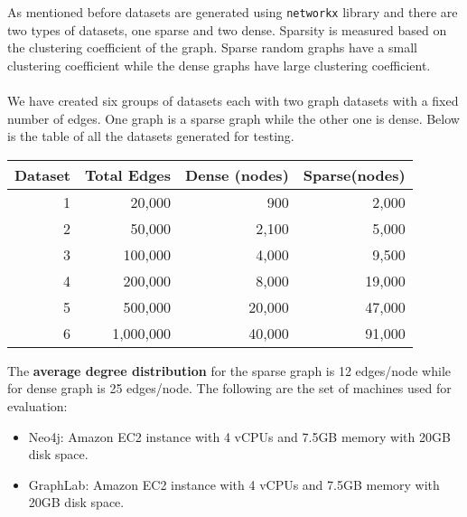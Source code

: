 As mentioned before datasets are generated using \texttt{networkx} library and there are two types of datasets, one sparse and two dense. Sparsity is measured based on the clustering coefficient of the graph. Sparse random graphs have a small clustering coefficient while the dense graphs have large clustering coefficient.\\
\\
We have created six groups of datasets each with two graph datasets with a fixed number of edges. One graph is a sparse graph while the other one is dense. Below is the table of all the datasets generated for testing.
\begin{table}[h]
\centering
	\begin{tabular}{|r|r|r|r|}
		\hline
		\multicolumn{1}{|c|}{Dataset} & \multicolumn{1}{c|}{Total Edges} & \multicolumn{1}{c|}{Dense (nodes)} & \multicolumn{1}{c|}{Sparse(nodes)} \\ \hline
		1                             & 20,000                           & 900                                & 2,000                              \\ \hline
		2                             & 50,000                           & 2,100                              & 5,000                              \\ \hline
		3                             & 100,000                          & 4,000                              & 9,500                              \\ \hline
		4                             & 200,000                          & 8,000                              & 19,000                             \\ \hline
		5                             & 500,000                          & 20,000                             & 47,000                             \\ \hline
		6                             & 1,000,000                        & 40,000                             & 91,000                             \\ \hline
	\end{tabular}
\end{table}
The \textbf{average degree distribution} for the sparse graph is 12 edges/node while for dense graph is 25 edges/node.
The following are the set of machines used for evaluation: 
\begin{itemize}
	\item
	Neo4j: Amazon EC2 instance with 4 vCPUs and 7.5GB memory with 20GB disk space.
	\item
	GraphLab: Amazon EC2 instance with 4 vCPUs and 7.5GB memory with 20GB disk space.
\end{itemize}
